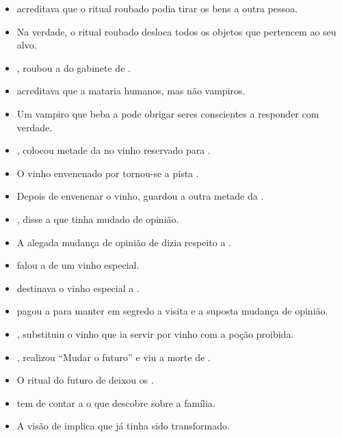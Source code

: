 \begin{itemize}
  \item {} acreditava que o ritual roubado podia tirar os bens a outra pessoa.
  \item Na verdade, o ritual roubado desloca todos os objetos que pertencem ao seu alvo.
  \item {},  roubou a  do gabinete de .
  \item {} acreditava que a  mataria humanos, mas não vampiros.
  \item Um vampiro que beba a  pode obrigar seres conscientes a responder com verdade.
  \item {},  colocou metade da  no vinho reservado para .
  \item O vinho envenenado por  tornou-se a pista .
  \item Depois de envenenar o vinho,  guardou a outra metade da .
  \item {},  disse a  que tinha mudado de opinião.
  \item A alegada mudança de opinião de  dizia respeito a .
  \item {} falou a  de um vinho especial.
  \item {} destinava o vinho especial a .
  \item {} pagou a  para manter em segredo a visita e a suposta mudança de opinião.
  \item {},  substituiu o vinho que  ia servir por vinho com a poção proibida.
  \item {},  realizou ``Mudar o futuro'' e viu a morte de .
  \item O ritual do futuro de  deixou os .
  \item {} tem de contar a  o que descobre sobre a família.
  \item A visão de  implica que  já tinha sido transformado.

\end{itemize}
